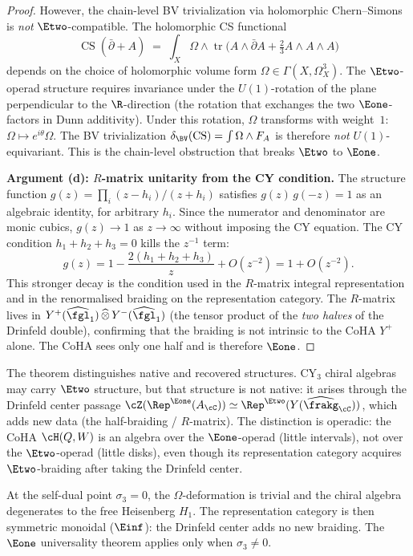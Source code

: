 \begin{proof}
However, the chain-level BV trivialization via holomorphic Chern--Simons is \emph{not} $\Etwo$-compatible. The holomorphic CS functional
\[
 \operatorname{CS}(\bar\partial + A) \;=\; \int_X \Omega \wedge \operatorname{tr}\!\bigl(A \wedge \bar\partial A + \tfrac{2}{3} A \wedge A \wedge A\bigr)
\]
depends on the choice of holomorphic volume form $\Omega \in \Gamma(X, \Omega^3_X)$. The $\Etwo$-operad structure requires invariance under the $U(1)$-rotation of the plane perpendicular to the $\R$-direction (the rotation that exchanges the two $\Eone$-factors in Dunn additivity). Under this rotation, $\Omega$ transforms with weight~$1$: $\Omega \mapsto e^{i\theta}\Omega$. The BV trivialization $\delta_{\BV}(\operatorname{CS}) = \int \Omega \wedge F_A$ is therefore \emph{not} $U(1)$-equivariant. This is the chain-level obstruction that breaks $\Etwo$ to $\Eone$.

\medskip
\noindent\textbf{Argument (d): $R$-matrix unitarity from the CY condition.}
The structure function $g(z) = \prod_i (z-h_i)/(z+h_i)$ satisfies $g(z)\,g(-z) = 1$ as an algebraic identity, for arbitrary \(h_i\). Since the numerator and denominator are monic cubics, \(g(z)\to 1\) as \(z\to\infty\) without imposing the CY equation. The CY condition \(h_1+h_2+h_3=0\) kills the \(z^{-1}\) term:
\[
 g(z)=1-\frac{2(h_1+h_2+h_3)}{z}+O(z^{-2})=1+O(z^{-2}).
\]
This stronger decay is the condition used in the $R$-matrix integral representation and in the renormalised braiding on the representation category. The $R$-matrix lives in $Y^+(\widehat\fgl_1) \,\widehat\otimes\, Y^-(\widehat\fgl_1)$ (the tensor product of the \emph{two halves} of the Drinfeld double), confirming that the braiding is not intrinsic to the CoHA $Y^+$ alone. The CoHA sees only one half and is therefore $\Eone$.

\medskip
\end{proof}


\begin{remark}
\label{rem:e1-vs-e2}
The theorem distinguishes native and recovered structures. CY$_3$ chiral algebras may carry $\Etwo$ structure, but that structure is not native: it arises through the Drinfeld center passage $\cZ(\Rep^{\Eone}(A_\cC)) \simeq \Rep^{\Etwo}(Y(\widehat\frakg_\cC))$, which adds new data (the half-braiding / $R$-matrix). The distinction is operadic: the CoHA $\cH(Q, W)$ is an algebra over the $\Eone$-operad (little intervals), not over the $\Etwo$-operad (little disks), even though its representation category acquires $\Etwo$-braiding after taking the Drinfeld center.

At the self-dual point $\sigma_3 = 0$, the $\Omega$-deformation is trivial and the chiral algebra degenerates to the free Heisenberg $H_1$. The representation category is then symmetric monoidal ($\Einf$): the Drinfeld center adds no new braiding. The $\Eone$ universality theorem applies only when $\sigma_3 \neq 0$.
\end{remark}


